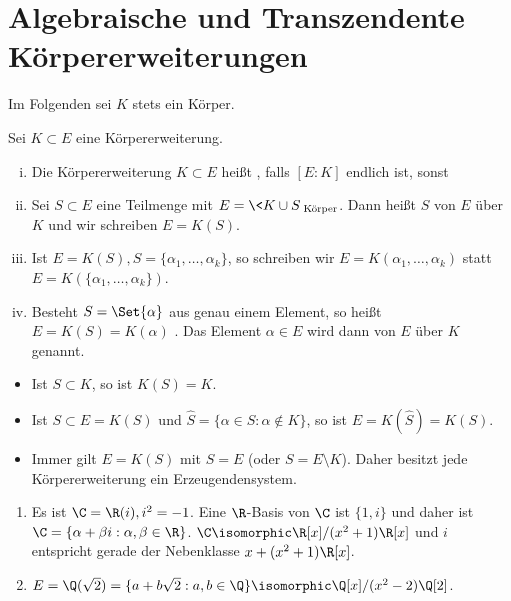 \section{Algebraische und Transzendente Körpererweiterungen}


Im Folgenden sei $K$ stets ein Körper.

\begin{df} \label{dup:18.3-1}
	Sei $K \subset E$ eine Körpererweiterung.
	\begin{enumerate}[i)]
		\item
			Die Körpererweiterung $K \subset E$ heißt , falls $[E : K]$ endlich ist, sonst 
		\item
			Sei $S \subset E$ eine Teilmenge mit $E = \<K \cup S\>_{\text{Körper}}$.
			Dann heißt $S$  von $E$ über $K$ und wir schreiben $E = K(S)$.
		\item
			Ist $E = K(S), S = \{\alpha_1, \dotsc, \alpha_k\}$, so schreiben wir $E = K(\alpha_1, \dotsc, \alpha_k)$ statt $E = K(\{\alpha_1, \dotsc, \alpha_k\})$.
		\item
			Besteht $S = \Set{\alpha}$ aus genau einem Element, so heißt $E = K(S) = K(\alpha)$ .
			Das Element $\alpha \in E$ wird dann  von $E$ über $K$ genannt.
	\end{enumerate}
	\begin{note}
		\begin{itemize}
			\item
				Ist $S \subset K$, so ist $K(S) = K$.
			\item
				Ist $S \subset E = K(S)$ und $\hat S = \{ \alpha \in S : \alpha \not\in K\}$, so ist $E = K(\hat S) = K(S)$.
			\item
				Immer gilt $E = K(S)$ mit $S = E$ (oder $S = E \setminus K$).
				Daher besitzt jede Körpererweiterung ein Erzeugendensystem.
		\end{itemize}
	\end{note}
\end{df}


\begin{ex*}
	\begin{enumerate}[1.)]
		\item
			Es ist $\C = \R(i), i^2 = -1$.
			Eine $\R$-Basis von $\C$ ist $\{1, i\}$ und daher ist $\C = \{ \alpha + \beta i : \alpha, \beta \in \R\}$.
			$\C \isomorphic \R[x] / (x^2+1) \R[x]$ und $i$ entspricht gerade der Nebenklasse $x + (x^2+1)\R[x]$.
		\item
			$E = \Q(\sqrt 2) = \{ a + b \sqrt 2 : a,b \in \Q \} \isomorphic \Q[x] / (x^2 - 2) \Q[2]$.
	\end{enumerate}
\end{ex*}

